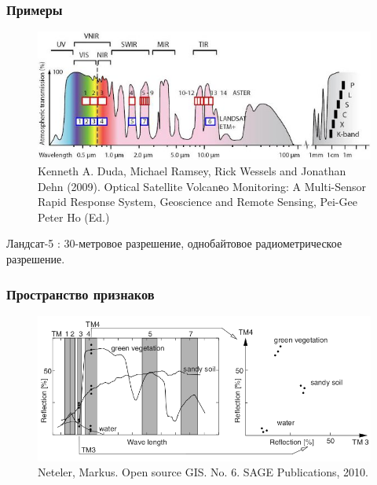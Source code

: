 \begin{frame}
    \frametitle{Примеры}
    \begin{figure}[!ht]
        \begin{center}
            \includegraphics[width=1.0\columnwidth]{./remote_sensing/img/bands}
        \end{center}
        \caption{\tiny Kenneth A. Duda, Michael Ramsey, Rick Wessels and Jonathan Dehn (2009). Optical Satellite Volcanеo Monitoring: A Multi-Sensor Rapid Response System, Geoscience and Remote Sensing, Pei-Gee Peter Ho (Ed.)}
    \end{figure}
    Ландсат-5 : 30-метровое разрешение, однобайтовое радиометрическое разрешение.
\end{frame}

\begin{frame}
    \frametitle{Пространство признаков}
    \begin{figure}[!ht]
        \begin{center}
            \includegraphics[width=1.0\columnwidth]{./remote_sensing/img/feature_space}
        \end{center}
        \caption{\tiny Neteler, Markus. Open source GIS. No. 6. SAGE Publications, 2010.}
    \end{figure}

\end{frame}
